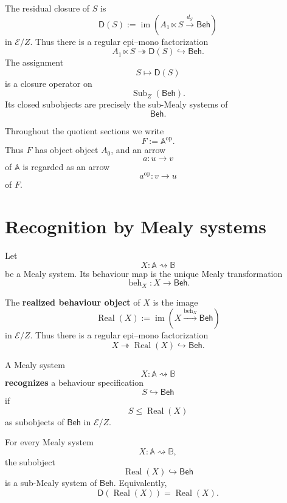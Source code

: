 The residual closure of \(S\) is
\[
\mathsf D(S)
:=
\operatorname{im}
\left(
A_1\ltimes S
\xrightarrow{d_S}
\mathsf{Beh}
\right)
\]
in \(\mathcal E/Z\). Thus there is a regular epi--mono factorization
\[
A_1\ltimes S
\twoheadrightarrow
\mathsf D(S)
\hookrightarrow
\mathsf{Beh}.
\]
The assignment
\[
S\longmapsto\mathsf D(S)
\]
is a closure operator on
\[
\operatorname{Sub}_Z(\mathsf{Beh}).
\]
Its closed subobjects are precisely the sub-Mealy systems of
\[
\mathsf{Beh}.
\]

Throughout the quotient sections we write
\[
F:=\mathbb A^{\mathrm{op}}.
\]
Thus \(F\) has object object \(A_0\), and an arrow
\[
a:u\to v
\]
of \(\mathbb A\) is regarded as an arrow
\[
a^{\mathrm{op}}:v\to u
\]
of \(F\).

\section{Recognition by Mealy systems}
\label{sec:eilenberg-recognition-by-mealy-systems}

Let
\[
X:\mathbb A\rightsquigarrow\mathbb B
\]
be a Mealy system. Its behaviour map is the unique Mealy transformation
\[
\operatorname{beh}_X:X\to\mathsf{Beh}.
\]

\begin{definition}
\label{def:eilenberg-realized-behaviour-object}
The \textbf{realized behaviour object} of \(X\) is the image
\[
\operatorname{Real}(X)
:=
\operatorname{im}
\left(
X\xrightarrow{\operatorname{beh}_X}\mathsf{Beh}
\right)
\]
in \(\mathcal E/Z\). Thus there is a regular epi--mono factorization
\[
X\twoheadrightarrow
\operatorname{Real}(X)
\hookrightarrow
\mathsf{Beh}.
\]
\end{definition}

\begin{definition}[Recognition]
\label{def:eilenberg-recognition}
A Mealy system
\[
X:\mathbb A\rightsquigarrow\mathbb B
\]
\textbf{recognizes} a behaviour specification
\[
S\hookrightarrow\mathsf{Beh}
\]
if
\[
S\leq\operatorname{Real}(X)
\]
as subobjects of \(\mathsf{Beh}\) in \(\mathcal E/Z\).
\end{definition}

\begin{proposition}
\label{prop:eilenberg-realized-behaviours-closed}
For every Mealy system
\[
X:\mathbb A\rightsquigarrow\mathbb B,
\]
the subobject
\[
\operatorname{Real}(X)\hookrightarrow\mathsf{Beh}
\]
is a sub-Mealy system of \(\mathsf{Beh}\). Equivalently,
\[
\mathsf D(\operatorname{Real}(X))
=
\operatorname{Real}(X).
\]
\end{proposition}


